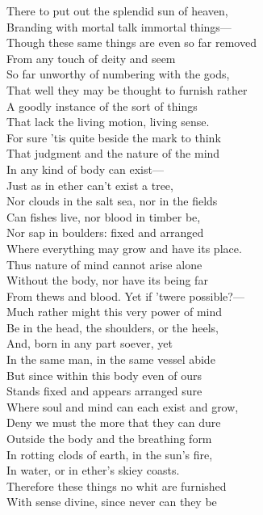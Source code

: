 There to put out the splendid sun of heaven,\\
Branding with mortal talk immortal things—\\
Though these same things are even so far removed\\
From any touch of deity and seem\\
So far unworthy of numbering with the gods,\\
That well they may be thought to furnish rather\\
A goodly instance of the sort of things\\
That lack the living motion, living sense.\\
For sure 'tis quite beside the mark to think\\
That judgment and the nature of the mind\\
In any kind of body can exist—\\
Just as in ether can't exist a tree,\\
Nor clouds in the salt sea, nor in the fields\\
Can fishes live, nor blood in timber be,\\
Nor sap in boulders: fixed and arranged\\
Where everything may grow and have its place.\\
Thus nature of mind cannot arise alone\\
Without the body, nor have its being far\\
From thews and blood. Yet if 'twere possible?—\\
Much rather might this very power of mind\\
Be in the head, the shoulders, or the heels,\\
And, born in any part soever, yet\\
In the same man, in the same vessel abide\\
But since within this body even of ours\\
Stands fixed and appears arranged sure\\
Where soul and mind can each exist and grow,\\
Deny we must the more that they can dure\\
Outside the body and the breathing form\\
In rotting clods of earth, in the sun's fire,\\
In water, or in ether's skiey coasts.\\
Therefore these things no whit are furnished\\
With sense divine, since never can they be\\
